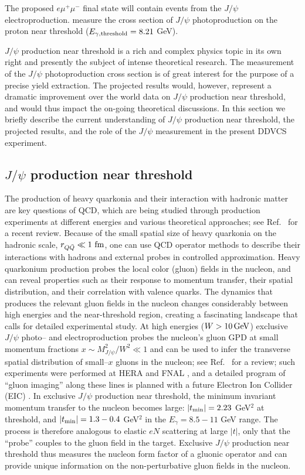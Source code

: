 The proposed $e\mu^+\mu^-$ final state will contain events from the $J/\psi$ electroproduction. measure the cross section of $J/\psi$ photoproduction 
on the proton near threshold ($E_{\gamma, {\rm threshold}} = 8.21$ GeV).

$J/\psi$ production near threshold is a rich and complex physics 
topic in its own right and presently the subject of intense theoretical 
research. The measurement of the $J/\psi$
photoproduction cross section is of great interest for the purpose of a
precise yield extraction. The projected results would, however, represent
a dramatic improvement over the world data on $J/\psi$ production near
threshold, and would thus impact the on-going theoretical discussions.
In this section we briefly describe the current understanding of 
$J/\psi$ production near threshold, the projected results, and the
role of the $J/\psi$ measurement in the present DDVCS experiment.


\subsection{$J/\psi$ production near threshold}
\label{subsec:JPsi}

The production of heavy quarkonia and their interaction with hadronic
matter are key questions of QCD, which are being studied through 
production experiments at different energies and various theoretical 
approaches; see Ref.~\cite{Brambilla:2010cs} for a recent review. 
Because of the small spatial size of heavy quarkonia on the hadronic 
scale, $r_{Q\bar Q} \ll 1~{\rm fm}$, one can use QCD operator methods
to describe their interactions with hadrons and external probes in
controlled approximation. Heavy quarkonium production probes the local 
color (gluon) fields in the nucleon, and can reveal properties such as 
their response to momentum transfer, their spatial distribution,
and their correlation with valence quarks. The dynamics that produces
the relevant gluon fields in the nucleon changes considerably
between high energies and the near-threshold region, creating a fascinating
landscape that calls for detailed experimental study. At high energies
($W > 10 \, {\rm GeV}$) exclusive $J/\psi$ photo-- and electroproduction 
probes the nucleon's gluon GPD at small momentum fractions 
$x \sim M_{J/\psi}^2/W^2 \ll 1$ and can be used to infer the transverse 
spatial distribution of small--$x$ gluons in the nucleon; 
see Ref.~\cite{frankfurt:2005mc} for a review; such experiments were 
performed at HERA \cite{aktas:2005xu,chekanov:2004mw} and FNAL 
\cite{binkley:1981kv}, and a detailed program of ``gluon imaging'' 
along these lines is planned with a future Electron Ion 
Collider (EIC) \cite{Boer:2011fh}. In exclusive $J/\psi$ production 
near threshold, the minimum invariant momentum transfer to the nucleon 
becomes large: $|t_{\rm min}| = 2.23$ GeV$^2$ at threshold, 
and $|t_{\rm min}| = 1.3-0.4$ GeV$^2$ in the $E_{\gamma} = 8.5-11$ 
GeV range. The process is therefore analogous to elastic $eN$ scattering 
at large $|t|$, only that the ``probe'' couples to the gluon field 
in the target. Exclusive $J/\psi$ production near threshold thus 
measures the nucleon form factor of a gluonic operator and can provide
unique information on the non-perturbative gluon fields in the nucleon.

